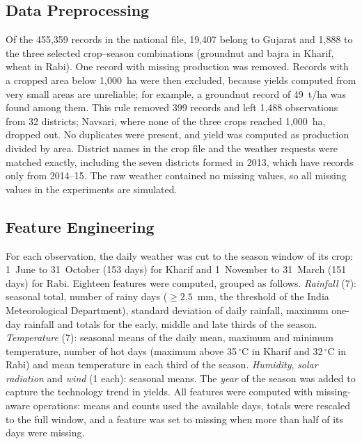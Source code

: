 \begin{table}[!t]
\caption{Analysis Dataset After Cleaning}\label{tab:data}
\centering\footnotesize\setlength{\tabcolsep}{3.5pt}


\vspace{2pt}{\scriptsize Obs.: district--year observations; Distr.: districts; yield as mean $\pm$
standard deviation.}
\end{table}

\subsection{Data Preprocessing}

Of the 455,359 records in the national file, 19,407 belong to Gujarat and 1,888 to the three
selected crop--season combinations (groundnut and bajra in Kharif, wheat in Rabi). One record
with missing production was removed. Records with a cropped area below 1,000~ha were then
excluded, because yields computed from very small areas are unreliable; for example, a groundnut
record of 49~t/ha was found among them. This rule removed 399 records and left 1,488 observations
from 32 districts; Navsari, where none of the three crops reached 1,000~ha, dropped out. No
duplicates were present, and yield was computed as production divided by area. District names in
the crop file and the weather requests were matched exactly, including the seven districts formed
in 2013, which have records only from 2014--15. The raw weather contained no missing values, so all
missing values in the experiments are simulated.

\subsection{Feature Engineering}

For each observation, the daily weather was cut to the season window of its crop: 1~June to
31~October (153 days) for Kharif and 1~November to 31~March (151 days) for Rabi. Eighteen features
were computed, grouped as follows. \emph{Rainfall} (7): seasonal total, number of rainy days
($\geq 2.5$~mm, the threshold of the India Meteorological Department), standard deviation of daily
rainfall, maximum one-day rainfall and totals for the early, middle and late thirds of the season.
\emph{Temperature} (7): seasonal means of the daily mean, maximum and minimum temperature, number of
hot days (maximum above 35\,$^\circ$C in Kharif and 32\,$^\circ$C in Rabi) and mean temperature in
each third of the season. \emph{Humidity}, \emph{solar radiation} and \emph{wind} (1 each): seasonal
means. The \emph{year} of the season was added to capture the technology trend in yields. All
features were computed with missing-aware operations: means and counts used the available days,
totals were rescaled to the full window, and a feature was set to missing when more than half of
its days were missing.

